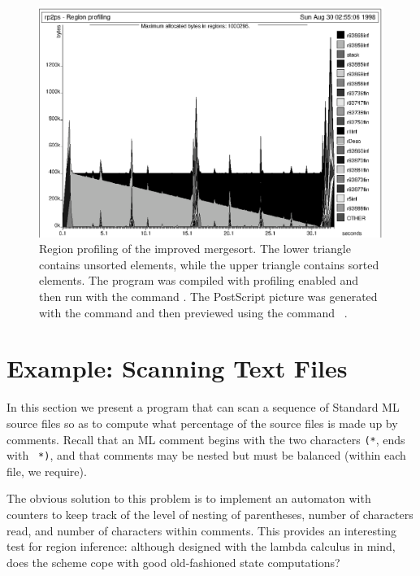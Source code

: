 \documentclass[12pt]{book}
\begin{document}
\begin{figure}
\begin{center}
\includegraphics{msortreset2.ps}
\end{center}
%
%
%
%
\caption{Region profiling of the improved mergesort. 
  The lower triangle contains unsorted elements, while the upper
  triangle contains sorted elements.  The program was compiled with
  profiling enabled and then run with the command . 
  The PostScript picture  was generated
  with the command 
  and then previewed using the command ~.}
\label{msortreset.fig}
\end{figure}

\section{Example: Scanning Text Files}
\label{scan.sec}
In this section we present a program that can 
%
scan a sequence of Standard ML source files so as to compute what
percentage of the source files is made up by comments. Recall that an
ML comment begins with the two characters {\tt (*}, ends with {\tt
  *)}, and that comments may be nested but must be balanced (within
each file, we require).

The obvious solution to this problem is to implement an automaton with
counters to keep track of the level of nesting of parentheses, number
of characters read, and number of characters within comments. This
provides an interesting test for region inference: although designed
with the lambda calculus in mind, does the scheme cope with good
old-fashioned state computations?
\end{document}

